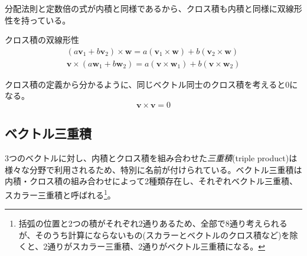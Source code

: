 分配法則と定数倍の式が内積と同様であるから、クロス積も内積と同様に双線形性を持っている。
\begin{theorem*}{クロス積の双線形性}
	\begin{equation}
		\begin{aligned}
			(a\boldsymbol{v}_1+b\boldsymbol{v}_2)\times\boldsymbol{w}=a(\boldsymbol{v}_1\times\boldsymbol{w} )+b(\boldsymbol{v}_2\times \boldsymbol{w}) \\
			\boldsymbol{v}\times(a\boldsymbol{w}_1+b\boldsymbol{w}_2)=a(\boldsymbol{v}\times \boldsymbol{w}_1)+b(\boldsymbol{v}\times \boldsymbol{w}_2)
		\end{aligned}
	\end{equation}
\end{theorem*}
クロス積の定義から分かるように、同じベクトル同士のクロス積を考えると0になる。
\begin{equation}
	\boldsymbol{v}\times\boldsymbol{v}=0
\end{equation}
\subsection{ベクトル三重積}
3つのベクトルに対し、内積とクロス積を組み合わせた\emph{三重積}(triple product)は様々な分野で利用されるため、特別に名前が付けられている。ベクトル三重積は内積・クロス積の組み合わせによって2種類存在し、それぞれベクトル三重積、スカラー三重積と呼ばれる\footnote{括弧の位置と2つの積がそれぞれ2通りあるため、全部で8通り考えられるが、そのうち計算にならないもの(スカラーとベクトルのクロス積など)を除くと、2通りがスカラー三重積、2通りがベクトル三重積になる。}。

